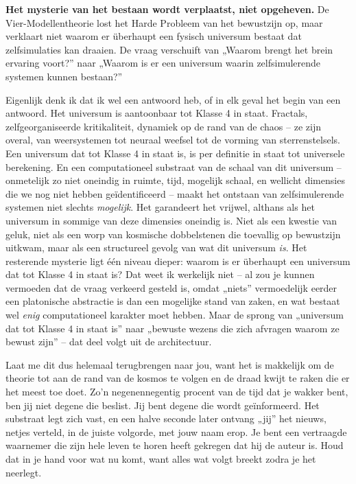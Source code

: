 \documentclass[11pt, twoside, openright]{book}
\begin{document}
\textbf{Het mysterie van het bestaan wordt verplaatst, niet opgeheven.} De Vier-Modellentheorie lost het Harde Probleem van het bewustzijn op, maar verklaart niet waarom er überhaupt een fysisch universum bestaat dat zelfsimulaties kan draaien. De vraag verschuift van „Waarom brengt het brein ervaring voort?” naar „Waarom is er een universum waarin zelfsimulerende systemen kunnen bestaan?”

Eigenlijk denk ik dat ik wel een antwoord heb, of in elk geval het begin van een antwoord. Het universum is aantoonbaar tot Klasse 4 in staat. Fractals, zelfgeorganiseerde kritikaliteit, dynamiek op de rand van de chaos -- ze zijn overal, van weersystemen tot neuraal weefsel tot de vorming van sterrenstelsels. Een universum dat tot Klasse 4 in staat is, is per definitie in staat tot universele berekening. En een computationeel substraat van de schaal van dit universum -- onmetelijk zo niet oneindig in ruimte, tijd, mogelijk schaal, en wellicht dimensies die we nog niet hebben geïdentificeerd -- maakt het ontstaan van zelfsimulerende systemen niet slechts \textit{mogelijk}. Het garandeert het vrijwel, althans als het universum in sommige van deze dimensies oneindig is. Niet als een kwestie van geluk, niet als een worp van kosmische dobbelstenen die toevallig op bewustzijn uitkwam, maar als een structureel gevolg van wat dit universum \textit{is}. Het resterende mysterie ligt één niveau dieper: waarom is er überhaupt een universum dat tot Klasse 4 in staat is? Dat weet ik werkelijk niet -- al zou je kunnen vermoeden dat de vraag verkeerd gesteld is, omdat „niets” vermoedelijk eerder een platonische abstractie is dan een mogelijke stand van zaken, en wat bestaat wel \textit{enig} computationeel karakter moet hebben. Maar de sprong van „universum dat tot Klasse 4 in staat is” naar „bewuste wezens die zich afvragen waarom ze bewust zijn” -- dat deel volgt uit de architectuur.

Laat me dit dus helemaal terugbrengen naar jou, want het is makkelijk om de theorie tot aan de rand van de kosmos te volgen en de draad kwijt te raken die er het meest toe doet. Zo'n negenennegentig procent van de tijd dat je wakker bent, ben jij niet degene die beslist. Jij bent degene die wordt geïnformeerd. Het substraat legt zich vast, en een halve seconde later ontvang „jij” het nieuws, netjes verteld, in de juiste volgorde, met jouw naam erop. Je bent een vertraagde waarnemer die zijn hele leven te horen heeft gekregen dat hij de auteur is. Houd dat in je hand voor wat nu komt, want alles wat volgt breekt zodra je het neerlegt.
\end{document}
